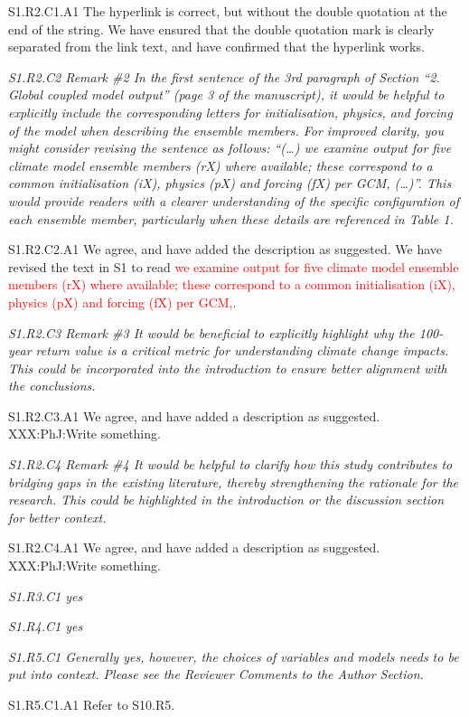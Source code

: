 \documentclass[a4paper,10pt]{article}
\newcommand{\ed}[1]{\textcolor{red}{#1}}
\begin{document}
	S1.R2.C1.A1 The hyperlink is correct, but without the double quotation at the end of the string. We have ensured that the double quotation mark is clearly separated from the link text, and have confirmed that the hyperlink works.
		
	\emph{S1.R2.C2 Remark \#2 In the first sentence of the 3rd paragraph of Section “2. Global coupled model output” (page 3 of the manuscript), it would be helpful to explicitly include the corresponding letters for initialisation, physics, and forcing of the model when describing the ensemble members. For improved clarity, you might consider revising the sentence as follows: “(…) we examine output for five climate model ensemble members (rX) where available; these correspond to a common initialisation (iX), physics (pX) and forcing (fX) per GCM, (…)”. This would provide readers with a clearer understanding of the specific configuration of each ensemble member, particularly when these details are referenced in Table 1.}
	
	S1.R2.C2.A1 We agree, and have added the description as suggested. We have revised the text in S1 to read \ed{we examine output for five climate model ensemble members (rX) where available; these correspond to a common initialisation (iX), physics (pX) and forcing (fX) per GCM,}.
	
	\emph{S1.R2.C3 Remark \#3 It would be beneficial to explicitly highlight why the 100-year return value is a critical metric for understanding climate change impacts. This could be incorporated into the introduction to ensure better alignment with the conclusions.}
	
	S1.R2.C3.A1 We agree, and have added a description as suggested. XXX:PhJ:Write something.

	\emph{S1.R2.C4 Remark \#4 It would be helpful to clarify how this study contributes to bridging gaps in the existing literature, thereby strengthening the rationale for the research. This could be highlighted in the introduction or the discussion section for better context.}
	
	S1.R2.C4.A1 We agree, and have added a description as suggested. XXX:PhJ:Write something.

	\emph{S1.R3.C1 yes}

	\emph{S1.R4.C1 yes}

	\emph{S1.R5.C1 Generally yes, however, the choices of variables and models needs to be put into context. Please see the Reviewer Comments to the Author Section.}
	
	S1.R5.C1.A1 Refer to S10.R5.
	
\end{document}
